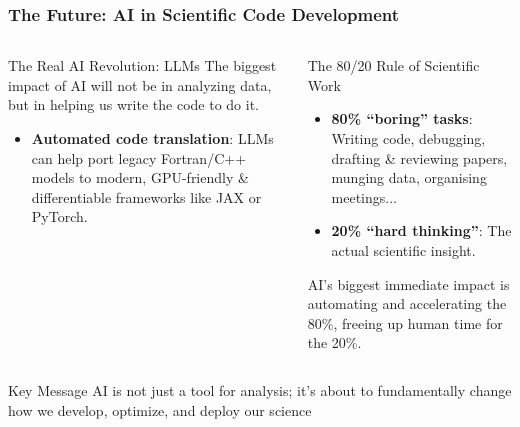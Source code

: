 \documentclass[aspectratio=169]{beamer}
\begin{document}
\begin{frame}
    \frametitle{The Future: AI in Scientific Code Development}
    \vspace{-1em}
    \begin{columns}[T]
        \begin{block}{The Real AI Revolution: LLMs}
            The biggest impact of AI will not be in analyzing data, but in helping us write the code to do it.
            \begin{itemize}
                \item \textbf{Automated code translation}: LLMs can help port legacy Fortran/C++ models to modern, GPU-friendly \& differentiable frameworks like JAX or PyTorch.
            \end{itemize}
        \end{block}
        \begin{block}{The 80/20 Rule of Scientific Work}
            \begin{itemize}
                \item \textbf{80\% ``boring'' tasks}: Writing code, debugging, drafting \& reviewing papers, munging data, organising meetings...
                \item \textbf{20\% ``hard thinking''}: The actual scientific insight.
            \end{itemize}
            AI's biggest immediate impact is automating and accelerating the 80\%, freeing up human time for the 20\%.
        \end{block}
    \end{columns}
    \begin{alertblock}{Key Message}
        AI is not just a tool for analysis; it's about to fundamentally change how we develop, optimize, and deploy our science
    \end{alertblock}
\end{frame}
\end{document}
